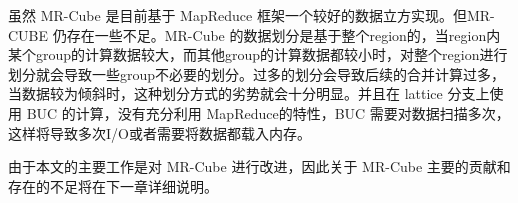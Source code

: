 虽然 MR-Cube 是目前基于 MapReduce 框架一个较好的数据立方实现。但MR-CUBE 仍存在一些不足。MR-Cube 的数据划分是基于整个region的，当region内某个group的计算数据较大，而其他group的计算数据都较小时，对整个region进行划分就会导致一些group不必要的划分。过多的划分会导致后续的合并计算过多，当数据较为倾斜时，这种划分方式的劣势就会十分明显。并且在 lattice 分支上使用 BUC 的计算，没有充分利用 MapReduce的特性，BUC 需要对数据扫描多次，这样将导致多次I/O或者需要将数据都载入内存。

由于本文的主要工作是对 MR-Cube 进行改进，因此关于 MR-Cube 主要的贡献和存在的不足将在下一章详细说明。



